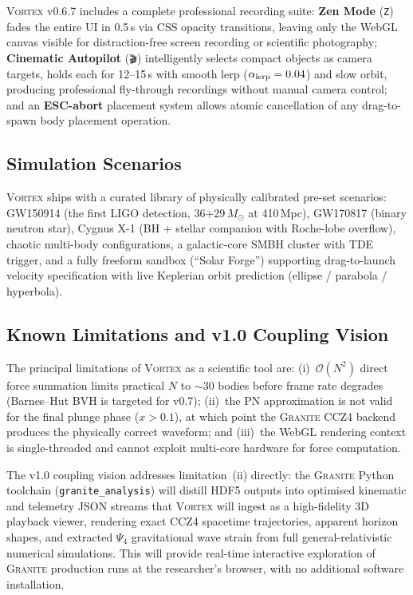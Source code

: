 \documentclass[aps,prd,twocolumn,superscriptaddress,nofootinbib,showpacs,
               longbibliography]{revtex4-2}
\newcommand{\granite}{\textsc{Granite}}
\newcommand{\code}[1]{\texttt{#1}}
\newcommand{\order}[1]{\mathcal{O}(#1)}
\begin{document}
\textsc{Vortex} v0.6.7 includes a complete professional recording suite:
\textbf{Zen Mode} (\code{Z}) fades the entire UI in 0.5\,s via CSS
opacity transitions, leaving only the WebGL canvas visible for
distraction-free screen recording or scientific photography;
\textbf{Cinematic Autopilot} (\code{🎬}) intelligently selects compact
objects as camera targets, holds each for 12--15\,s with smooth lerp
($\alpha_{\rm lerp} = 0.04$) and slow orbit, producing professional
fly-through recordings without manual camera control;
and an \textbf{ESC-abort} placement system allows atomic cancellation of
any drag-to-spawn body placement operation.

\subsection{Simulation Scenarios}
\label{sec:vortex_scenarios}

\textsc{Vortex} ships with a curated library of physically calibrated
pre-set scenarios:
GW150914 (the first LIGO detection, 36+29\,$M_\odot$ at 410\,Mpc),
GW170817 (binary neutron star),
Cygnus X-1 (BH + stellar companion with Roche-lobe overflow),
chaotic multi-body configurations, a galactic-core SMBH cluster with
TDE trigger, and a fully freeform sandbox (``Solar Forge'') supporting
drag-to-launch velocity specification with live Keplerian orbit
prediction (ellipse / parabola / hyperbola).

\subsection{Known Limitations and v1.0 Coupling Vision}
\label{sec:vortex_limits}

The principal limitations of \textsc{Vortex} as a scientific tool are:
(i)~$\order{N^2}$ direct force summation limits practical $N$ to
${\sim}30$ bodies before frame rate degrades (Barnes--Hut BVH is
targeted for v0.7);
(ii)~the PN approximation is not valid for the final plunge phase
($x > 0.1$), at which point the \granite{} CCZ4 backend produces
the physically correct waveform;
and (iii)~the WebGL rendering context is single-threaded and cannot
exploit multi-core hardware for force computation.

The v1.0 coupling vision addresses limitation~(ii) directly: the
\granite{} Python toolchain (\code{granite\_analysis}) will distill HDF5
outputs into optimised kinematic and telemetry JSON streams that
\textsc{Vortex} will ingest as a high-fidelity 3D playback viewer,
rendering exact CCZ4 spacetime trajectories, apparent horizon shapes,
and extracted $\Psi_4$ gravitational wave strain from full general-relativistic
numerical simulations.
This will provide real-time interactive exploration of \granite{} production
runs at the researcher's browser, with no additional software installation.
\end{document}
